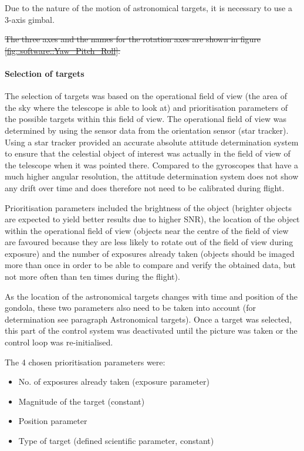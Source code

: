 Due to the nature of the motion of astronomical targets, it is necessary to use a 3-axis gimbal.

\st{The three axes and the names for the rotation axes are shown in figure \mbox{\ref{fig::software::Yaw_Pitch_Roll}}.}

\paragraph{Selection of targets}

The selection of targets was based on the operational field of view (the area of the sky where the telescope is able to look at) and prioritisation parameters of the possible targets within this field of view. The operational field of view was determined by using the sensor data from the orientation sensor (star tracker). Using a star tracker provided an accurate absolute attitude determination system to ensure that the celestial object of interest was actually in the field of view of the telescope when it was pointed there. Compared to the gyroscopes that have a much higher angular resolution, the attitude determination system does not show any drift over time and does therefore not need to be calibrated during flight.

Prioritisation parameters included the brightness of the object (brighter objects are expected to yield better results due to higher SNR), the location of the object within the operational field of view (objects near the centre of the field of view are favoured because they are less likely to rotate out of the field of view during exposure) and the number of exposures already taken (objects should be imaged more than once in order to be able to compare and verify the obtained data, but not more often than ten times during the flight). 

As the location of the astronomical targets changes with time and position of the gondola, these two parameters also need to be taken into account (for determination see paragraph Astronomical targets). Once a target was selected, this part of the control system was deactivated until the picture was taken or the control loop was re-initialised.

The 4 chosen prioritisation parameters were:
\begin{itemize}
	\item No. of exposures already taken (exposure parameter)
	\item Magnitude of the target (constant)
	\item Position parameter
	\item Type of target  (defined scientific parameter, constant)
\end{itemize}

